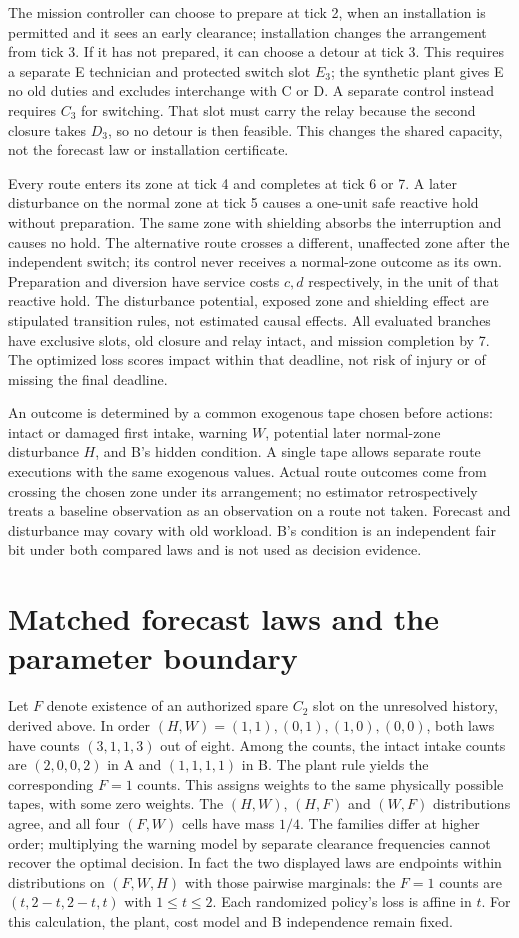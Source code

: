 \documentclass[11pt]{article}
\begin{document}
The mission controller can choose to prepare at tick 2, when an installation is permitted and it sees an early clearance; installation changes the arrangement from tick 3. If it has not prepared, it can choose a detour at tick 3. This requires a separate E technician and protected switch slot $E_3$; the synthetic plant gives E no old duties and excludes interchange with C or D. A separate control instead requires $C_3$ for switching. That slot must carry the relay because the second closure takes $D_3$, so no detour is then feasible. This changes the shared capacity, not the forecast law or installation certificate.

Every route enters its zone at tick 4 and completes at tick 6 or 7. A later disturbance on the normal zone at tick 5 causes a one-unit safe reactive hold without preparation. The same zone with shielding absorbs the interruption and causes no hold. The alternative route crosses a different, unaffected zone after the independent switch; its control never receives a normal-zone outcome as its own. Preparation and diversion have service costs $c,d$ respectively, in the unit of that reactive hold. The disturbance potential, exposed zone and shielding effect are stipulated transition rules, not estimated causal effects. All evaluated branches have exclusive slots, old closure and relay intact, and mission completion by 7. The optimized loss scores impact within that deadline, not risk of injury or of missing the final deadline.

An outcome is determined by a common exogenous tape chosen before actions: intact or damaged first intake, warning $W$, potential later normal-zone disturbance $H$, and B's hidden condition. A single tape allows separate route executions with the same exogenous values. Actual route outcomes come from crossing the chosen zone under its arrangement; no estimator retrospectively treats a baseline observation as an observation on a route not taken. Forecast and disturbance may covary with old workload. B's condition is an independent fair bit under both compared laws and is not used as decision evidence.

\section{Matched forecast laws and the parameter boundary}
Let $F$ denote existence of an authorized spare $C_2$ slot on the unresolved history, derived above. In order $(H,W)=(1,1),(0,1),(1,0),(0,0)$, both laws have counts $(3,1,1,3)$ out of eight. Among the counts, the intact intake counts are $(2,0,0,2)$ in A and $(1,1,1,1)$ in B. The plant rule yields the corresponding $F=1$ counts. This assigns weights to the same physically possible tapes, with some zero weights. The $(H,W)$, $(H,F)$ and $(W,F)$ distributions agree, and all four $(F,W)$ cells have mass $1/4$. The families differ at higher order; multiplying the warning model by separate clearance frequencies cannot recover the optimal decision. In fact the two displayed laws are endpoints within distributions on $(F,W,H)$ with those pairwise marginals: the $F=1$ counts are $(t,2-t,2-t,t)$ with $1\le t\le 2$. Each randomized policy's loss is affine in $t$. For this calculation, the plant, cost model and B independence remain fixed.
\end{document}
